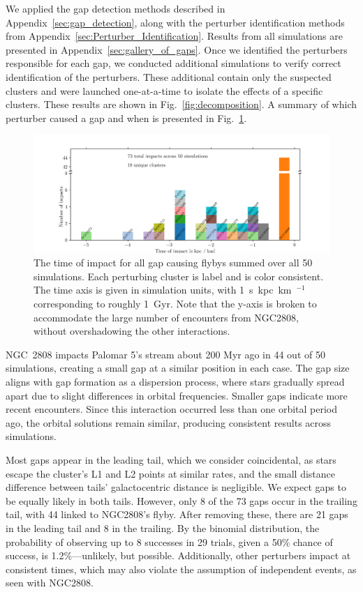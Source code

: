 \documentclass{aa}
\begin{document}
    We applied the gap detection methods described in Appendix~\ref{sec:gap_detection}, along with the perturber identification methods from Appendix~\ref{sec:Perturber_Identification}. Results from all simulations are presented in Appendix~\ref{sec:gallery_of_gaps}. Once we identified the perturbers responsible for each gap, we conducted additional simulations to verify correct identification of the perturbers. These additional contain only the suspected clusters and were launched one-at-a-time to isolate the effects of a specific clusters. These results are shown in Fig.~\ref{fig:decomposition}. A summary of which perturber caused a gap and when is presented in Fig.~\ref{fig:histogram_impact_time}. 

    \begin{figure}
      \centering
      \includegraphics[width=\linewidth]{histogram_impact_time.png}
      \caption{The time of impact for all gap causing flybys summed over all 50 simulations. Each perturbing cluster is label and is color consistent. The time axis is given in simulation units, with 1~s~kpc~km~$^{-1}$ corresponding to roughly 1~Gyr. Note that the y-axis is broken to accommodate the large number of encounters from NGC2808, without overshadowing the other interactions.}
      \label{fig:histogram_impact_time}
      \end{figure}



    NGC~2808 impacts Palomar 5's stream about 200 Myr ago in 44 out of 50 simulations, creating a small gap at a similar position in each case. The gap size aligns with gap formation as a dispersion process, where stars gradually spread apart due to slight differences in orbital frequencies. Smaller gaps indicate more recent encounters. Since this interaction occurred less than one orbital period ago, the orbital solutions remain similar, producing consistent results across simulations.


    Most gaps appear in the leading tail, which we consider coincidental, as stars escape the cluster's L1 and L2 points at similar rates, and the small distance difference between tails' galactocentric distance is negligible. We expect gaps to be equally likely in both tails. However, only 8 of the 73 gaps occur in the trailing tail, with 44 linked to NGC2808's flyby. After removing these, there are 21 gaps in the leading tail and 8 in the trailing. By the binomial distribution, the probability of observing up to 8 successes in 29 trials, given a 50\% chance of success, is 1.2\%—unlikely, but possible. Additionally, other perturbers impact at consistent times, which may also violate the assumption of independent events, as seen with NGC2808.
\end{document}
